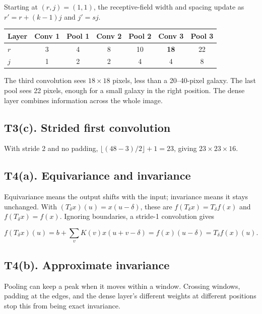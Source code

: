 \documentclass[11pt,a4paper]{article}
\begin{document}
Starting at $(r,j)=(1,1)$, the receptive-field width and spacing update as $r'=r+(k-1)j$ and $j'=sj$.

{\small\setlength{\tabcolsep}{4pt}
\begin{tabularx}{\linewidth}{|L|C|C|C|C|C|C|}
\hline
{}
\textbf{Layer} & \textbf{Conv 1} & \textbf{Pool 1} & \textbf{Conv 2} & \textbf{Pool 2} & \textbf{Conv 3} & \textbf{Pool 3} \\ \hline
$r$ & 3 & 4 & 8 & 10 & \textbf{18} & 22 \\ \hline
$j$ & 1 & 2 & 2 & 4 & 4 & 8 \\ \hline
\end{tabularx}\par}

The third convolution sees $18\times18$ pixels, less than a 20--40-pixel galaxy. The last pool sees 22 pixels, enough for a small galaxy in the right position. The dense layer combines information across the whole image.


\subsection*{T3(c). Strided first convolution}

With stride 2 and no padding, $\lfloor(48-3)/2\rfloor+1=23$, giving \textbf{$23\times23\times16$}.


\subsection*{T4(a). Equivariance and invariance}

Equivariance means the output shifts with the input; invariance means it stays unchanged. With $(T_\delta x)(u)=x(u-\delta)$, these are $f(T_\delta x)=T_\delta f(x)$ and $f(T_\delta x)=f(x)$. Ignoring boundaries, a stride-1 convolution gives

\[
f(T_\delta x)(u)=b+\sum_vK(v)x(u+v-\delta)=f(x)(u-\delta)=T_\delta f(x)(u).
\]


\subsection*{T4(b). Approximate invariance}

Pooling can keep a peak when it moves within a window. Crossing windows, padding at the edges, and the dense layer's different weights at different positions stop this from being exact invariance.
\end{document}
